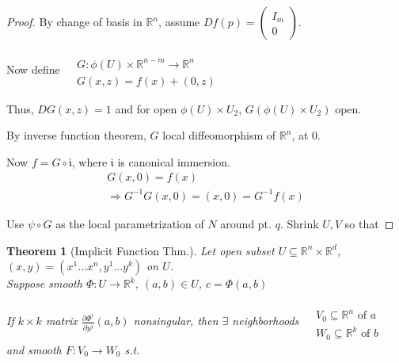 \documentclass[10pt]{amsart}
\newtheorem{theorem}{Theorem}
\begin{document}
\begin{multicols*}{2}
\begin{proof}
By change of basis in $\mathbb{R}^n$, assume $Df(p) = \left( \begin{matrix} I_m \\ 0 \end{matrix} \right)$.  

Now define $\begin{aligned} & \quad \\
  & G : \phi(U) \times \mathbb{R}^{n-m} \to \mathbb{R}^n \\
  & G(x,z) = f(x) + (0,z) \end{aligned}$

Thus, $DG(x,z) =1$ and for open $\phi(U) \times U_2$, $ G(\phi(U)\times U_2)$ open.  

By inverse function theorem, $G$ local diffeomorphism of $\mathbb{R}^n$, at $0$.  

Now $f = G\circ \mathfrak{i}$, where $\mathfrak{i}$ is canonical immersion.  
\[
\begin{gathered}
  G(x,0) = f(x) \\
  \Longrightarrow G^{-1}G(x,0) = (x,0) = G^{-1}f(x)
\end{gathered}
\]

Use $\psi \circ G$ as the local parametrization of $N$ around pt. $q$.  Shrink $U,V$ so that 


\end{proof}






\begin{theorem}[Implicit Function Thm.]
  Let open subset $U\subseteq \mathbb{R}^n \times \mathbb{R}^d$, $(x,y) = (x^1 \dots x^n, y^1 \dots y^k) $ on $U$.  \\
  Suppose smooth $\Phi:U\to \mathbb{R}^k$, $(a,b) \in U$, $c=\Phi(a,b)$

  If $k\times k$ matrix $\frac{ \partial \Phi^i}{ \partial y^j}(a,b)$ nonsingular, then $\exists $ neighborhoods $\begin{aligned} & \quad \\
    & V_0 \subseteq \mathbb{R}^n \text{ of $a$ } \\
    & W_0 \subseteq \mathbb{R}^k \text{ of $b$ } \end{aligned}$ and smooth $F:V_0 \to W_0$ s.t.


\end{theorem}
\end{multicols*}
\end{document}
